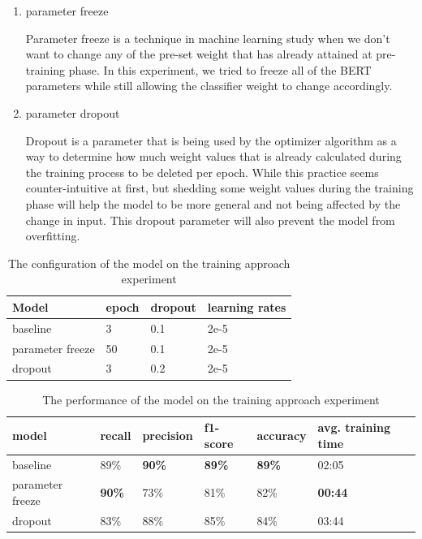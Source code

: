 \begin{enumerate}
  \item parameter freeze

        Parameter freeze is a technique in machine learning study when we don't want to change any of the pre-set weight that has already attained at pre-training phase. In this experiment, we tried to freeze all of the BERT parameters while still allowing the classifier weight to change accordingly.

  \item parameter dropout

        Dropout is a parameter that is being used by the optimizer algorithm as a way to determine how much weight values that is already calculated during the training process to be deleted per epoch. While this practice seems counter-intuitive at first, but shedding some weight values during the training phase will help the model to be more general and not being affected by the change in input. This dropout parameter will also prevent the model from overfitting.

\end{enumerate}

\begin{table}[h]
  \centering
  \caption{The configuration of the model on the training approach experiment}
  \label{tab: training_config}
  \begin{tabular}{|l|l|l|l|}
    \hline
    \textbf{Model}   & \textbf{epoch} & \textbf{dropout} & \textbf{learning rates} \\ \hline
    baseline         & 3              & 0.1              & 2e-5                    \\ \hline
    parameter freeze & 50             & 0.1              & 2e-5                    \\ \hline
    dropout          & 3              & 0.2              & 2e-5                    \\ \hline
  \end{tabular}
\end{table}

\begin{table}[h]
  \centering
  \caption{The performance of the model on the training approach experiment}
  \label{tab: model_training_result}
  \begin{tabular}{|p{.12\linewidth}|l|l|l|l|p{.12\linewidth}|}
    \hline
    \textbf{model}   & \textbf{recall} & \textbf{precision} & \textbf{f1-score} & \textbf{accuracy} & \textbf{avg. training time} \\ \hline
    baseline         & 89\%            & \textbf{90\%}      & \textbf{89\%}     & \textbf{89\%}     & 02:05                       \\ \hline
    parameter freeze & \textbf{90\%}   & 73\%               & 81\%              & 82\%              & \textbf{00:44}              \\ \hline
    dropout          & 83\%            & 88\%               & 85\%              & 84\%              & 03:44                       \\ \hline
  \end{tabular}
\end{table}

